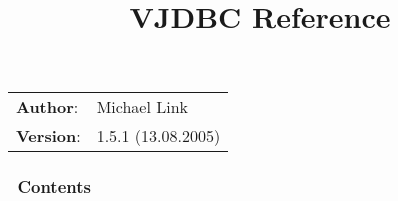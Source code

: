 \documentclass[10pt,a4paper,english]{article}
\title{VJDBC Reference}
\author{}
\date{}
\newlength{\docinfowidth}
\newlength{\locallinewidth}
\begin{document}
\maketitle

\begin{center}
\begin{tabularx}{\docinfowidth}{lX}
\textbf{Author}: &
	Michael Link \\
\textbf{Version}: &
	1.5.1 (13.08.2005) \\
\end{tabularx}
\end{center}

\setlength{\locallinewidth}{\linewidth}
\hypertarget{contents}{}
\subsubsection*{~\hfill Contents\hfill ~}
\end{document}
